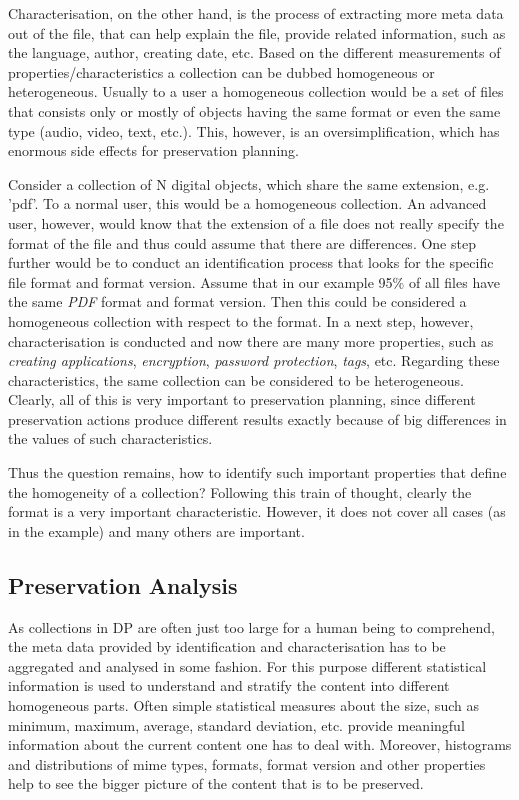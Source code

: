 Characterisation, on the other hand, is the process of extracting more meta data out of the file, that can help explain the file, provide related information, such as the language, author, creating date, etc. Based on the different measurements of properties/characteristics a collection can be dubbed homogeneous or heterogeneous. Usually to a user a homogeneous collection would be a set of files that consists only or mostly of objects having the same format or even the same type (audio, video, text, etc.). This, however, is an oversimplification, which has enormous side effects for preservation planning.

Consider a collection of N digital objects, which share the same extension, e.g. 'pdf'. To a normal user, this would be a homogeneous collection. An advanced user, however, would know that the extension of a file does not really specify the format of the file and thus could assume that there are differences.
One step further would be to conduct an identification process that looks for the specific file format and format version. Assume that in our example 95\% of all files have the same \textit{PDF} format and format version.  Then this could be considered a homogeneous collection with respect to the format.  In a next step, however, characterisation is conducted and now there are many more properties, such as \textit{creating applications}, \textit{encryption}, \textit{password protection}, \textit{tags}, etc.
Regarding these characteristics, the same collection can be considered to be heterogeneous.
Clearly, all of this is very important to preservation planning, since different preservation actions produce different results exactly because of big differences in the values of such characteristics.

Thus the question remains, how to identify such important properties that define the homogeneity of a collection? Following this train of thought, clearly the format is a very important characteristic. However, it does not cover all cases (as in the example) and many others are important.

\subsection{Preservation Analysis}
As collections in DP are often just too large for a human being to comprehend, the meta data provided by identification and characterisation has to be aggregated and analysed in some fashion. For this purpose different statistical information is used to understand and stratify the content into different homogeneous parts. Often simple statistical measures about the size, such as minimum, maximum, average, standard deviation, etc. provide meaningful information about the current content one has to deal with. Moreover, histograms and distributions of mime types, formats, format version and other properties help to see the bigger picture of the content that is to be preserved.

